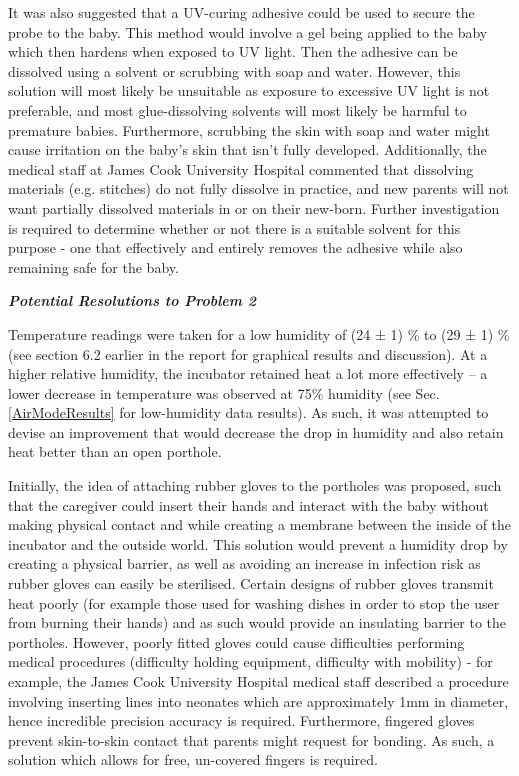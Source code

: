 \documentclass{article}
\begin{document}
\vspace{3mm}

It was also suggested that a UV-curing adhesive could be used to secure the probe to the baby. This method would involve a gel being applied to the baby which then hardens when exposed to UV light. Then the adhesive can be dissolved using a solvent or scrubbing with soap and water. However, this solution will most likely be unsuitable as exposure to excessive UV light is not preferable, and most glue-dissolving solvents will most likely be harmful to premature babies. Furthermore, scrubbing the skin with soap and water might cause irritation on the baby's skin that isn’t fully developed. Additionally, the medical staff at James Cook University Hospital commented that dissolving materials (e.g. stitches) do not fully dissolve in practice, and new parents will not want partially dissolved materials in or on their new-born. Further investigation is required to determine whether or not there is a suitable solvent for this purpose - one that effectively and entirely removes the adhesive while also remaining safe for the baby.

 
\vspace{9mm}
 
\newpage
\noindent \textbf{\textit{Potential Resolutions to Problem 2}}

 \vspace{3mm}

Temperature readings were taken for a low humidity of (24 ± 1) \% to (29 ± 1) \% (see section 6.2 earlier in the report for graphical results and discussion). At a higher relative humidity, the incubator retained heat a lot more effectively – a lower decrease in temperature was observed at 75\% humidity (see Sec. \ref{AirModeResults} for low-humidity data results). As such, it was attempted to devise an improvement that would decrease the drop in humidity and also retain heat better than an open porthole. 

 \vspace{3mm}

Initially, the idea of attaching rubber gloves to the portholes was proposed, such that the caregiver could insert their hands and interact with the baby without making physical contact and while creating a membrane between the inside of the incubator and the outside world. This solution would prevent a humidity drop by creating a physical barrier, as well as avoiding an increase in infection risk as rubber gloves can easily be sterilised. Certain designs of rubber gloves transmit heat poorly (for example those used for washing dishes in order to stop the user from burning their hands) and as such would provide an insulating barrier to the portholes. However, poorly fitted gloves could cause difficulties performing medical procedures (difficulty holding equipment, difficulty with mobility) - for example, the James Cook University Hospital medical staff described a procedure involving inserting lines into neonates which are approximately 1mm in diameter, hence incredible precision accuracy is required. Furthermore, fingered gloves prevent skin-to-skin contact that parents might request for bonding. As such, a solution which allows for free, un-covered fingers is required. 
\end{document}
